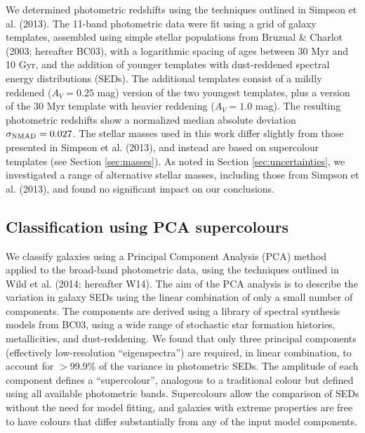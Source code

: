 \documentclass[a4paper,fleqn,usenatbib,useAMS]{mnras}
\begin{document}
We determined photometric redshifts using the techniques outlined in
Simpson et al. (2013). The 11-band photometric data were fit using a
grid of galaxy templates, assembled using simple stellar populations
from Bruzual \& Charlot (2003; hereafter BC03), with a logarithmic
spacing of ages between 30 Myr and 10 Gyr, and the addition of younger
templates with dust-reddened spectral energy distributions (SEDs). The
additional templates consist of a mildly reddened ($A_V=0.25$ mag)
version of the two youngest templates, plus a version of the 30 Myr
template with heavier reddening ($A_V=1.0$ mag).  The resulting
photometric redshifts show a normalized median absolute deviation
$\sigma_{{\rm NMAD}} = 0.027$. The stellar masses used in this work
differ slightly from those presented in Simpson et al. (2013), and
instead are based on supercolour templates (see Section
\ref{sec:masses}). As noted in Section \ref{sec:uncertainties}, 
we investigated a range of alternative stellar masses, including those
from Simpson et al. (2013), and found no significant impact on our conclusions.





\subsection{Classification using PCA supercolours}

We classify galaxies using a Principal Component Analysis (PCA) method
applied to the broad-band photometric data, using the techniques
outlined in Wild et al. (2014; hereafter W14). The aim of the PCA
analysis is to describe the variation in galaxy SEDs using the linear
combination of only a small number of components. The components are
derived using a library of spectral synthesis models from BC03, using
a wide range of stochastic star formation histories, metallicities,
and dust-reddening. We found that only three principal components
(effectively low-resolution ``eigenspectra'') are required, in linear
combination, to account for $>$99.9\% of the variance in photometric
SEDs. The amplitude of each component defines a ``supercolour'',
analogous to a traditional colour but defined using all available
photometric bands.  Supercolours allow the comparison of SEDs without
the need for model fitting, and galaxies with extreme properties are
free to have colours that differ substantially from any of the input
model components.
\end{document}
